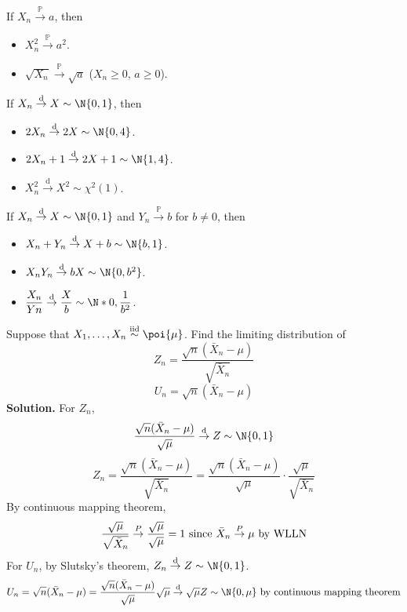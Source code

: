 \begin{Example}{}{}
    If $ X_n \stackrel{\mathbb{P}}{\to} a $, then
    \begin{itemize}
        \item $ X_n^2\stackrel{\mathbb{P}}{\to}a^2 $.
        \item $ \sqrt{X_n}\stackrel{\mathbb{P}}{\to}\sqrt{a} $
              ($ X_n\geqslant 0 $, $ a\geqslant 0 $).
    \end{itemize}

    If $ X_n\stackrel{\text{d}}{\to}X \sim \N{0,1} $, then
    \begin{itemize}
        \item $ 2X_n\stackrel{\text{d}}{\to}2X\sim\N{0,4} $.
        \item $ 2X_n+1\stackrel{\text{d}}{\to}2X+1\sim\N{1,4} $.
        \item $ X_n^2\stackrel{\text{d}}{\to} X^2 \sim \chi^2(1) $.
    \end{itemize}

    If $ X_n\stackrel{\text{d}}{\to}X \sim \N{0,1} $
    and $ Y_n\stackrel{\mathbb{P}}{\to}b $ for $ b\neq 0 $, then
    \begin{itemize}
        \item $ X_n+Y_n\stackrel{\text{d}}{\to}X+b \sim \N{b,1} $.
        \item $ X_n Y_n \stackrel{\text{d}}{\to}bX \sim \N{0,b^2} $.
        \item $ \displaystyle \frac{X_n}{Yn} \stackrel{\text{d}}{\to}
                  \frac{X}{b}\sim \N*{0,\frac{1}{b^2}} $.
    \end{itemize}
\end{Example}
\begin{Example}{}{}
    Suppose that $ X_1,\ldots,X_n\stackrel{\text{iid}}{\sim}\poi{\mu} $.
    Find the limiting distribution of
    \[ Z_n=\frac{\sqrt{n}(\bar{X}_n-\mu)}{\sqrt{\bar{X}_n}}  \]
    \[ U_n=\sqrt{n}(\bar{X}_n-\mu) \]
    \textbf{Solution.} For $ Z_n $,
    \[ \frac{\sqrt{n}(\bar{X}_n-\mu)}{\sqrt{\mu}}\stackrel{\text{d}}{\to}Z
        \sim \N{0,1}  \]
    \[ Z_n=\frac{\sqrt{n}(\bar{X}_n-\mu)}{\sqrt{\bar{X}_n}}=
        \frac{\sqrt{n}(\bar{X}_n-\mu)}{\sqrt{\mu}}\cdot\frac{\sqrt{\mu}}{\sqrt{\bar{X}_n}}    \]
    By continuous mapping theorem,
    \[ \frac{\sqrt{\mu}}{\sqrt{\bar{X}_n}}\stackrel{\mathbb{P}}{\to}\frac{\sqrt{\mu}}{\sqrt{\mu}}=1
        \text{ since $ \bar{X}_n\stackrel{\mathbb{P}}{\to}\mu $ by WLLN} \]
    For $ U_n $, by Slutsky's theorem, $ Z_n\stackrel{\text{d}}{\to}Z \sim \N{0,1} $.
    \[ U_n=\sqrt{n}(\bar{X}_n-\mu)=\frac{\sqrt{n}(\bar{X}_n-\mu)}{\sqrt{\mu}}\sqrt{\mu}
        \stackrel{\text{d}}{\to}\sqrt{\mu}Z \sim \N{0,\mu}\text{ by
            continuous mapping theorem}  \]
\end{Example}
